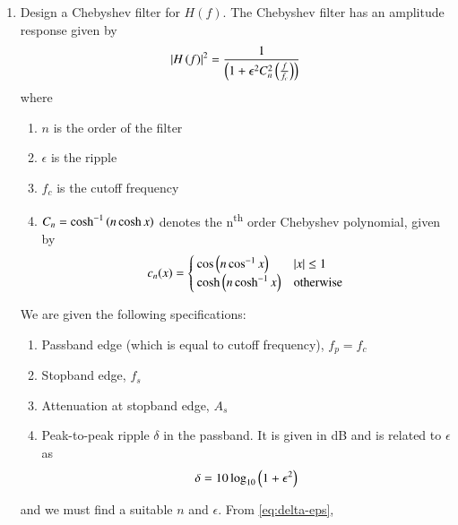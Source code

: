 \documentclass[journal,12pt,twocolumn]{IEEEtran}
\renewcommand\thesection{\arabic{section}}
\begin{document}
\begin{enumerate}[label=\thesection.\arabic*
,ref=\thesection.\theenumi]
\eqref{eq:fc2},
\begin{align}
    f_{c1} = f_p\sbrak{10^{-\frac{A_p}{10}} - 1}^{-\frac{1}{2n}} = \SI[parse-numbers=false]{57.23}{\hertz} \\
    f_{c2} = f_s\sbrak{10^{-\frac{A_s}{10}} - 1}^{-\frac{1}{2n}} = \SI[parse-numbers=false]{63.16}{\hertz}
\end{align}
Hence, we take $f_c = \sqrt{f_{c1}f_{c2}} = \SI[parse-numbers=false]{60}{\hertz}$ approximately.
\item Design a Chebyshev filter for $H(f)$.
\solution The Chebyshev filter has an amplitude response
given by
\begin{align}
    \left\vert H\left(f\right)\right\vert^2 = \frac{1}{\left(1 + \epsilon^2C_n^2\left(\frac{f}{f_c}\right)\right)}
\end{align}
where 
\begin{enumerate}
    \item $n$ is the order of the filter
    \item $\epsilon$ is the ripple
    \item $f_c$ is the cutoff frequency 
    \item $C_n = \cosh^{-1}\left(n\cosh{x}\right)$ denotes 
    the n\textsuperscript{th} order Chebyshev polynomial,
    given by
    \begin{align}
        c_n(x) =
        \begin{cases}
            \cos\left(n\cos^{-1}x\right) & \left\vert x\right\vert \le 1 \\
            \cosh\left(n\cosh^{-1}x\right) & \textrm{otherwise}
        \end{cases}
        \label{eq:chebypol}
    \end{align}
\end{enumerate}
We are given the following specifications:
\begin{enumerate}
    \item Passband edge (which is equal to 
    cutoff frequency), $f_p = f_c$
    \item Stopband edge, $f_s$
    \item Attenuation at stopband edge, $A_s$
    \item Peak-to-peak ripple $\delta$ in the passband.
    It is given in dB and is related to $\epsilon$ as
    \begin{align}
        \delta = 10\log_{10}\left(1 + \epsilon^2\right)
        \label{eq:delta-eps}
    \end{align}
\end{enumerate}
and we must find a suitable $n$ and $\epsilon$. From
\eqref{eq:delta-eps},

\end{enumerate}
\end{document}
